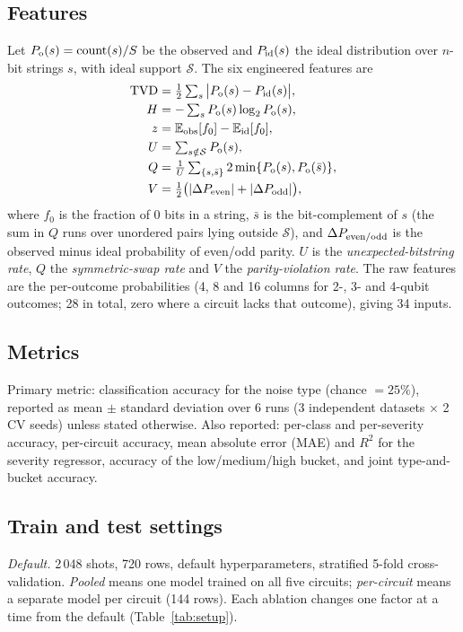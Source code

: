 \documentclass[conference]{IEEEtran}
\begin{document}
\subsection{Features}
Let $P_{\rm o}(s)=\mathrm{count}(s)/S$ be the observed and $P_{\rm id}(s)$ the ideal distribution over $n$-bit strings $s$, with ideal support $\mathcal{S}$. The six engineered features are
\begin{align}
\mathrm{TVD}&=\tfrac12\textstyle\sum_s\big|P_{\rm o}(s)-P_{\rm id}(s)\big|,\\
H&=-\textstyle\sum_s P_{\rm o}(s)\log_2 P_{\rm o}(s),\\
z&=\mathbb{E}_{\rm obs}[f_0]-\mathbb{E}_{\rm id}[f_0],\\
U&=\textstyle\sum_{s\notin\mathcal{S}}P_{\rm o}(s),\\
Q&=\tfrac{1}{U}\textstyle\sum_{\{s,\bar s\}}2\min\{P_{\rm o}(s),P_{\rm o}(\bar s)\},\\
V&=\tfrac12\big(|\Delta P_{\rm even}|+|\Delta P_{\rm odd}|\big),
\end{align}
where $f_0$ is the fraction of 0 bits in a string, $\bar s$ is the bit-complement of $s$ (the sum in $Q$ runs over unordered pairs lying outside $\mathcal{S}$), and $\Delta P_{\rm even/odd}$ is the observed minus ideal probability of even/odd parity. $U$ is the \emph{unexpected-bitstring rate}, $Q$ the \emph{symmetric-swap rate} and $V$ the \emph{parity-violation rate}. The raw features are the per-outcome probabilities (4, 8 and 16 columns for 2-, 3- and 4-qubit outcomes; 28 in total, zero where a circuit lacks that outcome), giving 34 inputs.

\subsection{Metrics}
Primary metric: classification accuracy for the noise type (chance $=25\%$), reported as mean $\pm$ standard deviation over 6 runs (3 independent datasets $\times$ 2 CV seeds) unless stated otherwise. Also reported: per-class and per-severity accuracy, per-circuit accuracy, mean absolute error (MAE) and $R^2$ for the severity regressor, accuracy of the low/medium/high bucket, and joint type-and-bucket accuracy.

\subsection{Train and test settings}
\emph{Default.} 2\,048 shots, 720 rows, default hyperparameters, stratified 5-fold cross-validation. \emph{Pooled} means one model trained on all five circuits; \emph{per-circuit} means a separate model per circuit (144 rows). Each ablation changes one factor at a time from the default (Table~\ref{tab:setup}).
\end{document}

